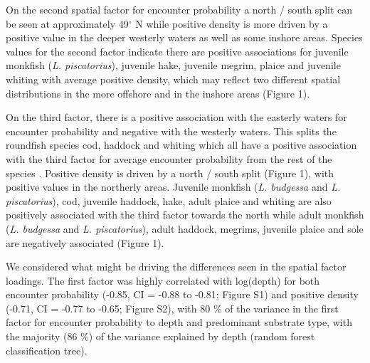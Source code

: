 \documentclass{nature}
\begin{document}
\begin{linenumbers}
On the second spatial factor for encounter probability a north / south split
can be seen at approximately 49$^{\circ}$ N while positive density is more
driven by a positive value in the deeper westerly waters as well as some
inshore areas. Species values for the second factor indicate there are
positive associations for juvenile monkfish (\emph{L. piscatorius}), juvenile
hake, juvenile megrim, plaice and juvenile whiting with average positive
density, which may reflect two different spatial distributions in the more
offshore and in the inshore areas (Figure 1).

On the third factor, there is a positive association with the easterly waters
for encounter probability and negative with the westerly waters. This
 splits the
roundfish species cod, haddock and whiting which all have a positive
association with the third factor for average encounter probability from the
rest of the species .
Positive density is driven by a north / south split (Figure 1), with positive
values in the northerly areas. Juvenile monkfish (\emph{L.  budgessa} and
\emph{L. piscatorius}), cod, juvenile haddock, hake, adult plaice and whiting
are also positively associated with the third factor towards the north while
adult monkfish (\emph{L. budgessa} and \emph{L.  piscatorius}), adult haddock,
megrims, juvenile plaice and sole are negatively associated  (Figure 1).

 We considered what might be driving the differences seen
in the spatial factor loadings. The first factor was highly correlated with
log(depth) for both encounter probability (-0.85, CI = -0.88 to -0.81; Figure
S1) and positive density (-0.71, CI = -0.77 to -0.65; Figure S2),  with 80 \% of the variance
in the first factor for encounter probability to depth and predominant
substrate type, with the majority (86 \%) of the variance explained by depth
(random forest classification tree). 


\end{linenumbers}
\end{document}
